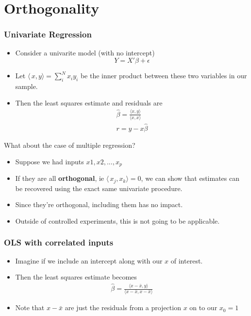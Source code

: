 \section{Orthogonality}

\begin{frame}
    \frametitle{Univariate Regression}
    \begin{itemize}
    \item Consider a univarite model (with no intercept)
    $$ Y= X'\beta + \epsilon $$
    \item Let $\langle\, x, y \rangle = \sum_i^N x_i y_i$ be the inner product between these two variables in our sample.
    \item Then the least squares estimate and residuals are 
    \begin{eqnarray*}
        \hat \beta = \frac{\langle x , y \rangle}{\langle x, x \rangle} \\
        r = y - x \hat \beta
    \end{eqnarray*}
    \end{itemize}
\end{frame}

\begin{frame}{What about the case of multiple regression?}
    \begin{itemize}
        \item Suppose we had inputs $x1,x2,...,x_p$
        \item If they are all \textbf{orthogonal}, ie $\langle\, x_j, x_k \rangle =0$, we can show that estimates can be recovered using the exact same univariate procedure. 
        \item Since they're orthogonal, including them has no impact. 
        \item Outside of controlled experiments, this is not going to be applicable. 
\end{itemize}
\end{frame}

\begin{frame}
    \frametitle{OLS with correlated inputs}
    \begin{itemize}
    \item Imagine if we include an intercept along with our $x$ of interest.
    \item Then the least squares estimate becomes 
    \begin{eqnarray*}
        \hat \beta = \frac{\langle x - \bar x , y \rangle}{\langle x - \bar x , x - \bar x \rangle}
    \end{eqnarray*}
    \item Note that $x - \bar x $ are just the residuals from a projection $x$ on to our $x_0= 1$
    \end{itemize}
\end{frame}

